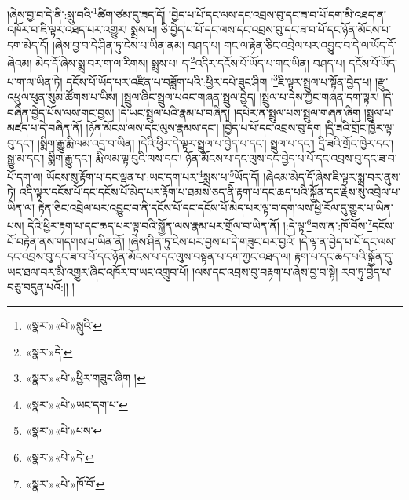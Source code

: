 །ཞེས་བྱ་བ་དེ་ནི་:སླུ་བའི་\footnote{«སྣར་»«པེ་»སླུའི་}ཚིག་ཙམ་དུ་ཟད་དོ། །བྱེད་པ་པོ་དང་ལས་དང་འབྲས་བུ་དང་ཟ་བ་པོ་དག་མི་འཐད་ན། འཁོར་བ་ཇི་ལྟར་འཐད་པར་འགྱུར། སྨྲས་པ། ཅི་བྱེད་པ་པོ་དང་ལས་དང་འབྲས་བུ་དང་ཟ་བ་པོ་དང་ཉོན་མོངས་པ་དག་མེད་དོ། །ཞེས་བྱ་བ་དེ་ཤིན་ཏུ་ངེས་པ་ཡིན་ནམ། བཤད་པ། གང་ལ་རྟེན་ཅིང་འབྲེལ་པར་འབྱུང་བ་དེ་ལ་ཡོད་དོ་ཞེའམ། མེད་དོ་ཞེས་སྨྲ་བར་ག་ལ་རིགས། སྨྲས་པ། ད་\footnote{«སྣར་»དེ་}འདིར་དངོས་པོ་ཡོད་པ་གང་ཡིན། བཤད་པ། དངོས་པོ་ཡོད་པ་ག་ལ་ཡིན་ཏེ། དངོས་པོ་ཡོད་པར་འཛིན་པ་བཟློག་པའི་:ཕྱིར་དཔེ་ཟུང་ཤིག །\footnote{«སྣར་»«པེ་»ཕྱིར་གཟུང་ཞིག །}ཇི་ལྟར་སྤྲུལ་པ་སྟོན་བྱེད་པ། །རྫུ་འཕྲུལ་ཕུན་སུམ་ཚོགས་པ་ཡིས། །སྤྲུལ་ཞིང་སྤྲུལ་པའང་གཞན་སྤྲུལ་བྱེད། །སྤྲུལ་པ་དེས་ཀྱང་གཞན་དག་ལྟར། །དེ་བཞིན་བྱེད་པོས་ལས་གང་བྱས། །དེ་ཡང་སྤྲུལ་པའི་རྣམ་པ་བཞིན། །དཔེར་ན་སྤྲུལ་པས་སྤྲུལ་གཞན་ཞིག །སྤྲུལ་པ་མཛད་པ་དེ་བཞིན་ནོ། །ཉོན་མོངས་ལས་དང་ལུས་རྣམས་དང་། །བྱེད་པ་པོ་དང་འབྲས་བུ་དག །དྲི་ཟའི་གྲོང་ཁྱེར་ལྟ་བུ་དང་། །སྨིག་རྒྱུ་རྨི་ལམ་འདྲ་བ་ཡིན། །དེའི་ཕྱིར་དེ་ལྟར་སྤྲུལ་པ་བྱེད་པ་དང་། སྤྲུལ་པ་དང་། དྲི་ཟའི་གྲོང་ཁྱེར་དང་། སྒྱུ་མ་དང་། སྨིག་རྒྱུ་དང་། རྨི་ལམ་ལྟ་བུའི་ལས་དང་། ཉོན་མོངས་པ་དང་ལུས་དང་བྱེད་པ་པོ་དང་འབྲས་བུ་དང་ཟ་བ་པོ་དག་ལ། ཡོངས་སུ་རྟོག་པ་དང་ལྡན་པ་:ཡང་དག་པར་\footnote{«སྣར་»«པེ་»ཡང་དག་པ་}སྨྲས་པ་\footnote{«སྣར་»«པེ་»པས་}ཡོད་དོ། །ཞེའམ་མེད་དོ་ཞེས་ཇི་ལྟར་སྨྲ་བར་ནུས་ཏེ། འདི་ལྟར་དངོས་པོ་དང་དངོས་པོ་མེད་པར་རྟོག་པ་ཐམས་ཅད་ནི་རྟག་པ་དང་ཆད་པའི་སྐྱོན་དང་རྗེས་སུ་འབྲེལ་པ་ཡིན་ལ། རྟེན་ཅིང་འབྲེལ་པར་འབྱུང་བ་ནི་དངོས་པོ་དང་དངོས་པོ་མེད་པར་ལྟ་བ་དག་ལས་ཕྱི་རོལ་དུ་གྱུར་པ་ཡིན་པས། དེའི་ཕྱིར་རྟག་པ་དང་ཆད་པར་ལྟ་བའི་སྐྱོན་ལས་རྣམ་པར་གྲོལ་བ་ཡིན་ནོ། །:དེ་ལྟ་\footnote{«སྣར་»«པེ་»དེ་}བས་ན་:ཁོ་བོས་\footnote{«སྣར་»«པེ་»ཁོ་བོ་}དངོས་པོ་བརྟེན་ནས་གདགས་པ་ཡིན་ནོ། །ཞེས་ཤིན་ཏུ་ངེས་པར་བྱས་པ་དེ་གཟུང་བར་བྱའོ། །དེ་ལྟ་ན་བྱེད་པ་པོ་དང་ལས་དང་འབྲས་བུ་དང་ཟ་བ་པོ་དང་ཉོན་མོངས་པ་དང་ལུས་བསྟན་པ་དག་ཀྱང་འཐད་ལ། རྟག་པ་དང་ཆད་པའི་སྐྱོན་དུ་ཡང་ཐལ་བར་མི་འགྱུར་ཞིང་འཁོར་བ་ཡང་འགྲུབ་པོ། །ལས་དང་འབྲས་བུ་བརྟག་པ་ཞེས་བྱ་བ་སྟེ། རབ་ཏུ་བྱེད་པ་བཅུ་བདུན་པའོ:།། །
